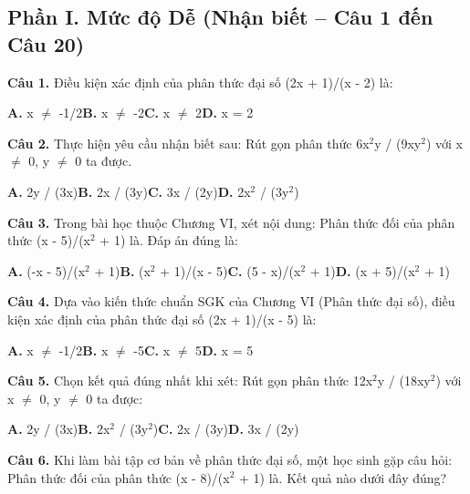 \documentclass[11pt,a4paper]{article}
\begin{document}
\subsection*{\color{accent} Phần I. Mức độ Dễ (Nhận biết -- Câu 1 đến Câu 20)}
\textbf{\color{primary} Câu 1.} Điều kiện xác định của phân thức đại số (2x + 1)/(x - 2) là:\par
\hspace*{1.5em}\textbf{A.} x $\ne$ -1/2\quad\quad \textbf{B.} x $\ne$ -2\quad\quad \textbf{C.} x $\ne$ 2\quad\quad \textbf{D.} x = 2\par\vspace{2pt}
\textbf{\color{primary} Câu 2.} Thực hiện yêu cầu nhận biết sau: Rút gọn phân thức 6x$^2$y / (9xy$^2$) với x $\ne$ 0, y $\ne$ 0 ta được.\par
\hspace*{1.5em}\textbf{A.} 2y / (3x)\quad\quad \textbf{B.} 2x / (3y)\quad\quad \textbf{C.} 3x / (2y)\quad\quad \textbf{D.} 2x$^2$ / (3y$^2$)\par\vspace{2pt}
\textbf{\color{primary} Câu 3.} Trong bài học thuộc Chương VI, xét nội dung: Phân thức đối của phân thức (x - 5)/(x$^2$ + 1) là. Đáp án đúng là:\par
\hspace*{1.5em}\textbf{A.} (-x - 5)/(x$^2$ + 1)\quad\quad \textbf{B.} (x$^2$ + 1)/(x - 5)\quad\quad \textbf{C.} (5 - x)/(x$^2$ + 1)\quad\quad \textbf{D.} (x + 5)/(x$^2$ + 1)\par\vspace{2pt}
\textbf{\color{primary} Câu 4.} Dựa vào kiến thức chuẩn SGK của Chương VI (Phân thức đại số), điều kiện xác định của phân thức đại số (2x + 1)/(x - 5) là:\par
\hspace*{1.5em}\textbf{A.} x $\ne$ -1/2\quad\quad \textbf{B.} x $\ne$ -5\quad\quad \textbf{C.} x $\ne$ 5\quad\quad \textbf{D.} x = 5\par\vspace{2pt}
\textbf{\color{primary} Câu 5.} Chọn kết quả đúng nhất khi xét: Rút gọn phân thức 12x$^2$y / (18xy$^2$) với x $\ne$ 0, y $\ne$ 0 ta được:\par
\hspace*{1.5em}\textbf{A.} 2y / (3x)\quad\quad \textbf{B.} 2x$^2$ / (3y$^2$)\quad\quad \textbf{C.} 2x / (3y)\quad\quad \textbf{D.} 3x / (2y)\par\vspace{2pt}
\textbf{\color{primary} Câu 6.} Khi làm bài tập cơ bản về phân thức đại số, một học sinh gặp câu hỏi: Phân thức đối của phân thức (x - 8)/(x$^2$ + 1) là. Kết quả nào dưới đây đúng?\par
\end{document}

